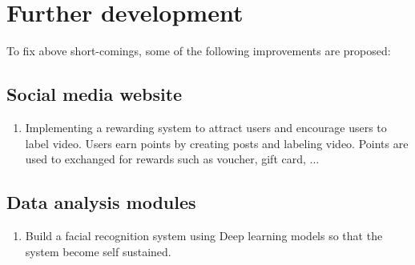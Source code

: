 \section{Further development}
To fix above short-comings, some of the following improvements are proposed:
\subsection{Social media website}\begin{enumerate}
\item Implementing a rewarding system to attract users and encourage users to label video. Users earn points by creating posts and labeling video. Points are used to exchanged for rewards such as voucher, gift card, ...
\end{enumerate}
\subsection{Data analysis modules}
\begin{enumerate}
\item Build a facial recognition system using Deep learning models so that the system become self sustained.
\end{enumerate}


